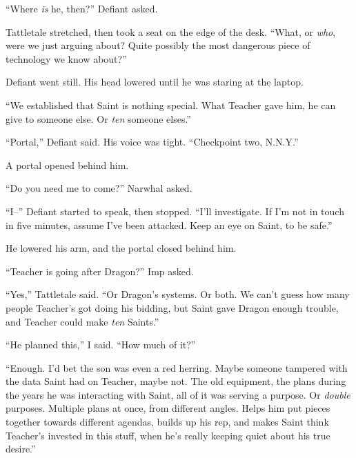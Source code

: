 ``Where \emph{is} he, then?'' Defiant asked.



Tattletale stretched, then took a seat on the edge of the desk.  ``What, or \emph{who}, were we just arguing about?  Quite possibly the most dangerous piece of technology we know about?''



Defiant went still.  His head lowered until he was staring at the laptop.



``We established that Saint is nothing special.  What Teacher gave him, he can give to someone else.  Or \emph{ten} someone elses.''



``Portal,'' Defiant said.  His voice was tight.  ``Checkpoint two, N.N.Y.''



A portal opened behind him.



``Do you need me to come?''  Narwhal asked.



``I--'' Defiant started to speak, then stopped.  ``I'll investigate.  If I'm not in touch in five minutes, assume I've been attacked.  Keep an eye on Saint, to be safe.''



He lowered his arm, and the portal closed behind him.



``Teacher is going after Dragon?''  Imp asked.



``Yes,'' Tattletale said.  ``Or Dragon's systems.  Or both.  We can't guess how many people Teacher's got doing his bidding, but Saint gave Dragon enough trouble, and Teacher could make \emph{ten} Saints.''



``He planned this,'' I said.  ``How much of it?''



``Enough.  I'd bet the son was even a red herring.  Maybe someone tampered with the data Saint had on Teacher, maybe not.  The old equipment, the plans during the years he was interacting with Saint, all of it was serving a purpose.  Or \emph{double} purposes.  Multiple plans at once, from different angles.  Helps him put pieces together towards different agendas, builds up his rep, and makes Saint think Teacher's invested in this stuff, when he's really keeping quiet about his true desire.''



